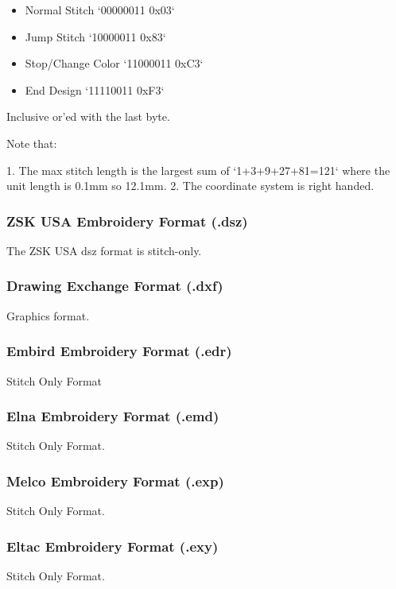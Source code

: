 \documentclass[a4paper, 11pt]{report}
\begin{document}
\begin{itemize}
\item Normal Stitch `00000011 0x03`
\item Jump Stitch `10000011 0x83`
\item Stop/Change Color `11000011 0xC3`
\item End Design `11110011 0xF3`
\end{itemize}

Inclusive or'ed with the last byte.

Note that:

  1. The max stitch length is the largest sum of `1+3+9+27+81=121` where the unit length is 0.1mm so 12.1mm.
  2. The coordinate system is right handed.

\subsubsection{ZSK USA Embroidery Format (.dsz)}

The ZSK USA dsz format is stitch-only.

\subsubsection{Drawing Exchange Format (.dxf)}

Graphics format.

\subsubsection{Embird Embroidery Format (.edr)}

Stitch Only Format

\subsubsection{Elna Embroidery Format (.emd)}

Stitch Only Format.

\subsubsection{Melco Embroidery Format (.exp)}

Stitch Only Format.

\subsubsection{Eltac Embroidery Format (.exy)}

Stitch Only Format.
\end{document}
